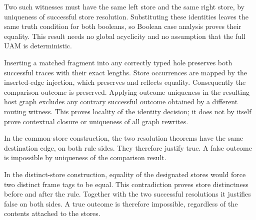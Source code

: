 Two such witnesses must have the same left store and the same right store,
by uniqueness of successful store resolution. Substituting these identities
leaves the same truth condition for both booleans, so Boolean case analysis
proves their equality. This result needs no global acyclicity and no
assumption that the full UAM is deterministic.



Inserting a matched fragment into any correctly typed hole preserves both
successful traces with their exact lengths. Store occurrences are mapped
by the inserted-edge injection, which preserves and reflects equality.
Consequently the comparison outcome is preserved. Applying outcome
uniqueness in the resulting host graph excludes any contrary successful
outcome obtained by a different routing witness. This proves locality of
the identity decision; it does not by itself prove contextual closure or
uniqueness of all graph rewrites.



In the common-store construction, the two resolution theorems have the
same destination edge, on both rule sides. They therefore justify true.
A false outcome is impossible by uniqueness of the comparison result.




In the distinct-store construction, equality of the designated stores
would force two distinct frame tags to be equal. This contradiction proves
store distinctness before and after the rule. Together with the two
successful resolutions it justifies false on both sides. A true outcome
is therefore impossible, regardless of the contents attached to the stores.



